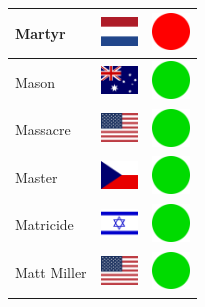 \documentclass[12pt, a4paper, twoside]{report}
\begin{document}
\begin{center}
\begin{longtable}{|p{5cm}|p{2cm}|p{2cm}|}
 Martyr                                                     & \includegraphics[width=1cm]{../4x3/nl} &   \includegraphics[width=1cm]{../likes/n} \\ \hline
 Mason                                                      & \includegraphics[width=1cm]{../4x3/au} &   \includegraphics[width=1cm]{../likes/y} \\ \hline
 Massacre                                                   & \includegraphics[width=1cm]{../4x3/us} &   \includegraphics[width=1cm]{../likes/y} \\ \hline
 Master                                                     & \includegraphics[width=1cm]{../4x3/cz} &   \includegraphics[width=1cm]{../likes/y} \\ \hline
 Matricide                                                  & \includegraphics[width=1cm]{../4x3/il} &   \includegraphics[width=1cm]{../likes/y} \\ \hline
 Matt Miller                                                & \includegraphics[width=1cm]{../4x3/us} &   \includegraphics[width=1cm]{../likes/y} \\ \hline

\end{longtable}
\end{center}
\end{document}
